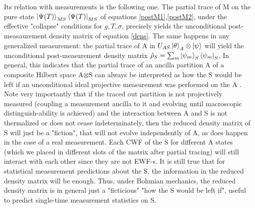 \documentclass[11pt, a4paper]{article} %
\begin{document}
Its relation with measurements is the following one. The partial trace of M on the pure state $\ket{\Psi(T)}_{MS}\bra{\Psi(T)}_{MS}$ of equations \eqref{postM1},\eqref{postM2}, under the effective "collapse" conditions for $g,T,\sigma$, precisely yields the unconditional post-measaurement density matrix of equation \eqref{dens}. The same happens in any generalized measurement: the partial trace of A in $U_{AS}\ket{\theta}_A\otimes\ket{\psi}$ will yield the unconditional post-measurement density matrix $\hat{\rho}_S=\sum_m \ket{\psi_m}_S\bra{\psi_m}_S$. In general, this indicates that the partial trace of an ancilla partition A of a composite Hilbert space A$\otimes$S can always be interpreted as how the S would be left if an unconditional ideal projective measurement was performed on the A \cite{Generalized}. Note very importantly that if the traced out partition is not projectively measured (coupling a measurement ancilla to it and evolving until macroscopic distinguish-ability is achieved) and the interaction between A and S is not thermalized or does not cease indeterminately, then the reduced density matrix of S will just be a "fiction", that will not evolve  independently of A, as does happen in the case of a real measurement. Each CWF of the S for different A states (which we placed in different slots of the matrix after partial tracing) will still interact with each other since they are not EWF-s. It is still true that for statistical measurement predictions about the S, the information in the reduced density matrix will be enough. Thus, under Bohmian mechanics, the reduced density matrix is in general just a "ficticious" "how the S would be left if", useful to predict single-time measurement statistics on S. %
\end{document}
